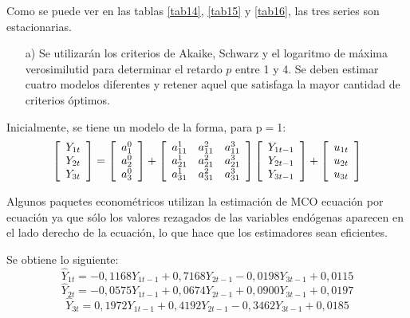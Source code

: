 Como se puede ver en las tablas \ref{tab14}, \ref{tab15} y \ref{tab16}, las tres series son estacionarias.

\begin{enumerate}
      \item[a)] Se utilizar\'{a}n los criterios de Akaike, Schwarz y el logaritmo de m\'{a}xima verosimilutid para determinar el retardo $p$ entre 1 y 4. Se deben estimar cuatro modelos diferentes y retener aquel que satisfaga la mayor cantidad de criterios \'{o}ptimos.
\end{enumerate}

Inicialmente, se tiene un modelo de la forma, para p$=$1:
\[
\left[ {\begin{array}{*{20}c}
Y_{1t}\\
Y_{2t}\\
Y_{3t}\\
\end{array} } \right]=\left[ {\begin{array}{*{20}c}
a_{1}^{0}\\
a_{2}^{0}\\
a_{3}^{0}\\
\end{array} } \right]+\left[ {\begin{array}{*{20}c}
a_{11}^{1} & a_{11}^{2} & a_{11}^{3}\\
a_{21}^{1} & a_{21}^{2} & a_{21}^{3}\\
a_{31}^{1} & a_{31}^{2} & a_{31}^{3}\\
\end{array} } \right]\left[ {\begin{array}{*{20}c}
Y_{1t-1}\\
Y_{2t-1}\\
Y_{3t-1}\\
\end{array} } \right]+\left[ {\begin{array}{*{20}c}
u_{1t}\\
u_{2t}\\
u_{3t}\\
\end{array} } \right]
\]

Algunos paquetes econom\'{e}tricos utilizan la estimaci\'{o}n de MCO ecuaci\'{o}n por ecuaci\'{o}n ya que s\'{o}lo los valores rezagados de las variables end\'{o}genas aparecen en el lado derecho de la ecuaci\'{o}n, lo que hace que los estimadores sean eficientes.\newline

Se obtiene lo siguiente:
\[
\hat{Y}_{1t}=-0,1168Y_{1t-1}+0,7168Y_{2t-1}-0,0198Y_{3t-1}+0,0115
\]
\[
\hat{Y}_{2t}=-0,0575Y_{1t-1}+0,0674Y_{2t-1}+0,0900Y_{3t-1}+0,0197
\]
\[
\hat{Y}_{3t}=0,1972Y_{1t-1}+0,4192Y_{2t-1}-0,3462Y_{3t-1}+0,0185
\]

